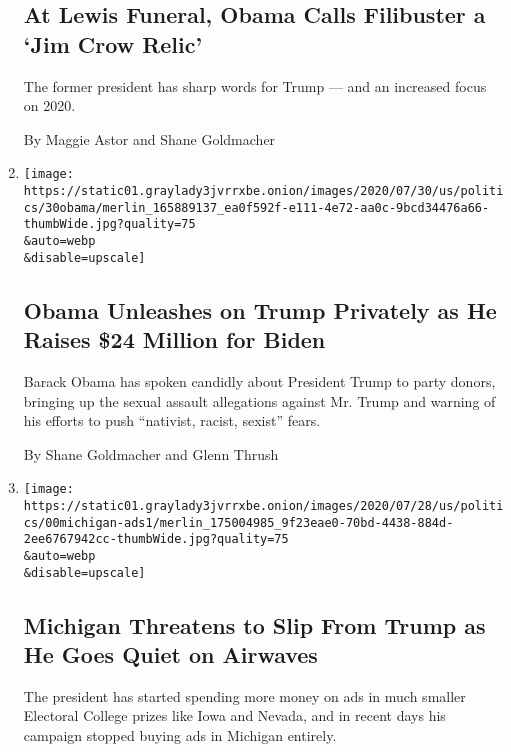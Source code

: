 \begin{enumerate}
{  \subsection{At Lewis Funeral, Obama Calls Filibuster a `Jim Crow
  Relic'}\label{at-lewis-funeral-obama-calls-filibuster-a-jim-crow-relic}}

  The former president has sharp words for Trump --- and an increased
  focus on 2020.

  By Maggie Astor and Shane Goldmacher
\item
  \href{/2020/07/30/us/politics/obama-trump-biden.html}{}

  \texttt{[image: https://static01.graylady3jvrrxbe.onion/images/2020/07/30/us/politics/30obama/merlin\_165889137\_ea0f592f-e111-4e72-aa0c-9bcd34476a66-thumbWide.jpg?quality=75\\\&auto=webp\\\&disable=upscale]}

  \hypertarget{obama-unleashes-on-trump-privately-as-he-raises-24-million-for-biden}{%
  \subsection{Obama Unleashes on Trump Privately as He Raises \$24
  Million for
  Biden}\label{obama-unleashes-on-trump-privately-as-he-raises-24-million-for-biden}}

  Barack Obama has spoken candidly about President Trump to party
  donors, bringing up the sexual assault allegations against Mr. Trump
  and warning of his efforts to push ``nativist, racist, sexist'' fears.

  By Shane Goldmacher and Glenn Thrush
\item
  \href{/2020/07/29/us/politics/michigan-trump-biden-2020.html}{}

  \texttt{[image: https://static01.graylady3jvrrxbe.onion/images/2020/07/28/us/politics/00michigan-ads1/merlin\_175004985\_9f23eae0-70bd-4438-884d-2ee6767942cc-thumbWide.jpg?quality=75\\\&auto=webp\\\&disable=upscale]}

  \hypertarget{michigan-threatens-to-slip-from-trump-as-he-goes-quiet-on-airwaves}{%
  \subsection{Michigan Threatens to Slip From Trump as He Goes Quiet on
  Airwaves}\label{michigan-threatens-to-slip-from-trump-as-he-goes-quiet-on-airwaves}}

  The president has started spending more money on ads in much smaller
  Electoral College prizes like Iowa and Nevada, and in recent days his
  campaign stopped buying ads in Michigan entirely.


\end{enumerate}
